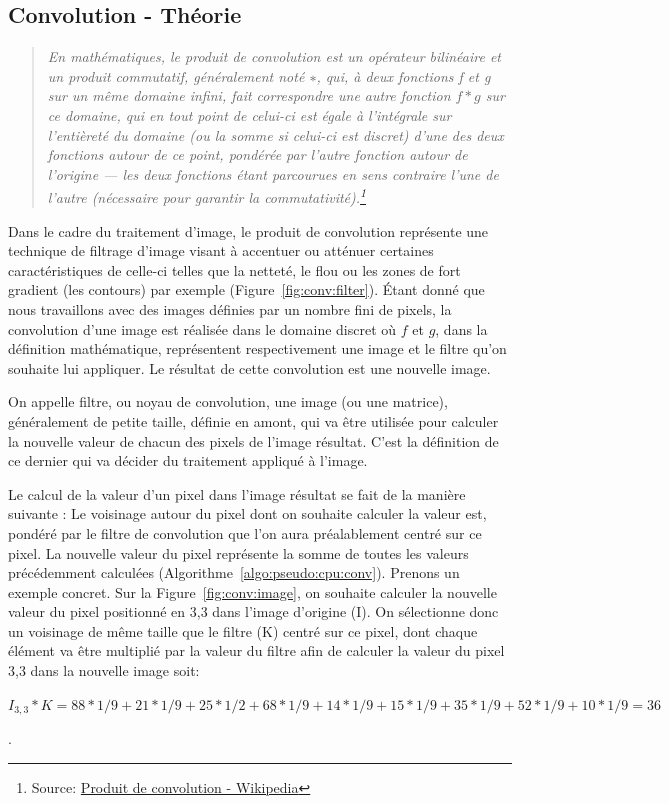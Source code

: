 \subsection{Convolution - Théorie}
\begin{quotation}
\textit{En mathématiques, le produit de convolution est un opérateur bilinéaire et un produit commutatif, généralement noté $∗$, qui, à deux fonctions f et g sur un même domaine infini, fait correspondre une autre fonction $f * g$ sur ce domaine, qui en tout point de celui-ci est égale à l'intégrale sur l'entièreté du domaine (ou la somme si celui-ci est discret) d'une des deux fonctions autour de ce point, pondérée par l'autre fonction autour de l'origine — les deux fonctions étant parcourues en sens contraire l'une de l'autre (nécessaire pour garantir la commutativité).\footnote{Source: \href{https://fr.wikipedia.org/wiki/Produit_de_convolution}{Produit de convolution - Wikipedia}}}
\end{quotation}

Dans le cadre du traitement d'image, le produit de convolution représente une technique de filtrage d'image visant à accentuer ou atténuer certaines caractéristiques de celle-ci telles que la netteté, le flou ou les zones de fort gradient (les contours) par exemple (Figure~\ref{fig:conv:filter}). Étant donné que nous travaillons avec des images définies par un nombre fini de pixels, la convolution d'une image est réalisée dans le domaine discret où $f$ et $g$, dans la définition mathématique, représentent respectivement une image et le filtre qu'on souhaite lui appliquer. Le résultat de cette convolution est une nouvelle image.

On appelle filtre, ou noyau de convolution, une image (ou une matrice), généralement de petite taille, définie en amont, qui va être utilisée pour calculer la nouvelle valeur de chacun des pixels de l'image résultat. C'est la définition de ce dernier qui va décider du traitement appliqué à l'image. 

Le calcul de la valeur d'un pixel dans l'image résultat se fait de la manière suivante : Le voisinage autour du pixel dont on souhaite calculer la valeur est, pondéré par le filtre de convolution que l'on aura préalablement centré sur ce pixel. La nouvelle valeur du pixel représente la somme de toutes les valeurs précédemment calculées (Algorithme~\ref{algo:pseudo:cpu:conv}). Prenons un exemple concret. Sur la Figure~\ref{fig:conv:image}, on souhaite calculer la nouvelle valeur du pixel positionné en 3,3 dans l'image d'origine (I). On sélectionne donc un voisinage de même taille que le filtre (K) centré sur ce pixel, dont chaque élément va être multiplié par la valeur du filtre afin de calculer la valeur du pixel 3,3 dans la nouvelle image soit: 
\begin{center}
$I_{3,3} * K = 88 * 1/9 + 21 * 1/9 + 25 * 1/2 + 68 * 1/9 + 14 * 1/9 + 15 * 1/9 + 35 * 1/9 + 52 * 1/9 + 10 * 1/9 = 36$
\end{center}.

